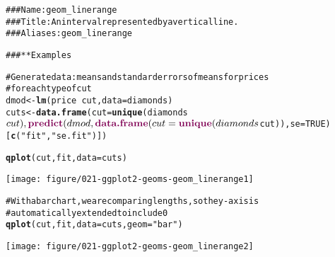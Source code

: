 \documentclass[a4paper,titlepage]{tufte-handout}\usepackage{graphicx, color}
\makeatletter
\def\maxwidth{ %
  \ifdim\Gin@nat@width>\linewidth
    \linewidth
  \else
    \Gin@nat@width
  \fi
}
\newcommand{\hlfunctioncall}[1]{\textcolor[rgb]{0.501960784313725,0,0.329411764705882}{\textbf{#1}}}%
\newcommand{\hlstring}[1]{\textcolor[rgb]{0.6,0.6,1}{#1}}%
\newcommand{\hlcomment}[1]{\textcolor[rgb]{0.180392156862745,0.6,0.341176470588235}{#1}}%
\newenvironment{kframe}{%
 \def\at@end@of@kframe{}%
 \ifinner\ifhmode%
  \def\at@end@of@kframe{\end{minipage}}%
  \begin{minipage}{\columnwidth}%
 \fi\fi%
 \def\FrameCommand##1{\hskip\@totalleftmargin \hskip-\fboxsep
 \colorbox{shadecolor}{##1}\hskip-\fboxsep
     \hskip-\linewidth \hskip-\@totalleftmargin \hskip\columnwidth}%
 \MakeFramed {\advance\hsize-\width
   \@totalleftmargin\z@ \linewidth\hsize
   \@setminipage}}%
 {\par\unskip\endMakeFramed%
 \at@end@of@kframe}
\newenvironment{knitrout}{}{} %
\makeatother
\begin{document}
\begin{knitrout}
\color{fgcolor}\begin{kframe}
\begin{alltt}
\hlcomment{### Name: geom_linerange}
\hlcomment{### Title: An interval represented by a vertical line.}
\hlcomment{### Aliases: geom_linerange}

\hlcomment{### ** Examples}

\hlcomment{# Generate data: means and standard errors of means for prices}
\hlcomment{# for each type of cut}
dmod <- \hlfunctioncall{lm}(price ~ cut, data=diamonds)
cuts <- \hlfunctioncall{data.frame}(cut=\hlfunctioncall{unique}(diamonds$cut), \hlfunctioncall{predict}(dmod, \hlfunctioncall{data.frame}(cut = \hlfunctioncall{unique}(diamonds$cut)), se=TRUE)[\hlfunctioncall{c}(\hlstring{"fit"},\hlstring{"se.fit"})])

\hlfunctioncall{qplot}(cut, fit, data=cuts)
\end{alltt}
\end{kframe}
\texttt{[image: figure/021-ggplot2-geoms-geom\_linerange1]} 
\begin{kframe}\begin{alltt}
\hlcomment{# With a bar chart, we are comparing lengths, so the y-axis is}
\hlcomment{# automatically extended to include 0}
\hlfunctioncall{qplot}(cut, fit, data=cuts, geom=\hlstring{"bar"})
\end{alltt}
\end{kframe}
\texttt{[image: figure/021-ggplot2-geoms-geom\_linerange2]} 
\begin{kframe}\begin{alltt}


\end{alltt}
\end{kframe}
\end{knitrout}
\end{document}
